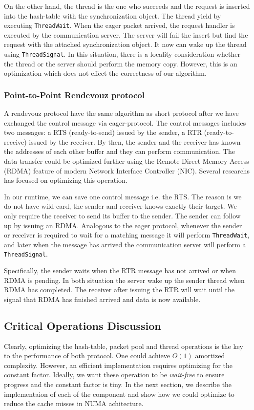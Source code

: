 \documentclass[11pt]{article}
\begin{document}
On the other hand, the thread is the one who succeeds and the request is
inserted into the hash-table with the synchronization object. The thread yield
by executing \texttt{ThreadWait}. When the eager packet arrived, the
request handler is executed by the communication server. The server will fail
the insert but find the request with the attached synchronization object. It
now can wake up the thread using \texttt{ThreadSignal}. In this situation,
there is a locality consideration whether the thread or the server should
perform the memory copy. However, this is an optimization which does not effect
the correctness of our algorithm.

\subsubsection{Point-to-Point Rendevouz protocol}
A rendevouz protocol have the same algorithm as short protocol after we have
exchanged the control message via eager-protocol. The control messages 
includes two messages: a RTS (ready-to-send) issued by the sender, a RTR
(ready-to-receive) issued by the receiver. By then, the sender and the receiver
has known the addresses of each other buffer and they can perform
communication.  The data transfer could be optimized further using the
Remote Direct Memory Access (RDMA) feature of modern Network Interface
Controller (NIC).  Several researchs has focused on optimizing this operation.

In our runtime, we can save one control message i.e. the RTS.  The reason is
we do not have wild-card, the sender and receiver knows exactly their target.
We only require the receiver to send its buffer to the sender. The sender can
follow up by issuing an RDMA.  Analogous to the eager protocol, whenever the
sender or receiver is required to wait for a matching message it will perform
\texttt{ThreadWait}, and later when the message has arrived the communication server
will perform a \texttt{ThreadSignal}.

Specifically, the sender waits when the RTR message has not arrived or when
RDMA is pending. In both situation the server wake up the sender thread when
RDMA has completed. The receiver after issuing the RTR will wait until the
signal that RDMA has finished arrived and data is now available.

\subsection{Critical Operations Discussion}
Clearly, optimizing the hash-table, packet pool and thread operations is the
key to the performance of both protocol. One could achieve $O(1)$ amortized
complexity.  However, an efficient implementation requires optimizing for the
constant factor. Ideally, we want these operation to be \textit{wait-free} to
ensure progress and the constant factor is tiny. In the next section, we
describe the implementaion of each of the component and show how we could
optimize to reduce the cache misses in NUMA achitecture.
\end{document}
